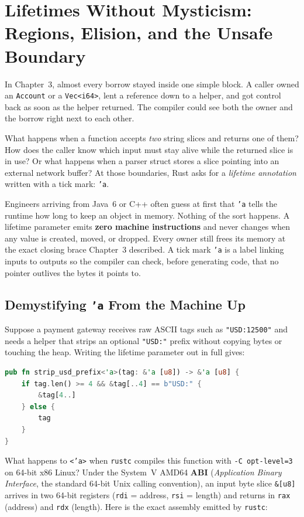 \chapter{Lifetimes Without Mysticism: Regions, Elision, and the Unsafe Boundary}

In Chapter~3, almost every borrow stayed inside one simple block. A caller owned an \texttt{Account} or a \texttt{Vec<i64>}, lent a reference down to a helper, and got control back as soon as the helper returned. The compiler could see both the owner and the borrow right next to each other.

What happens when a function accepts \emph{two} string slices and returns one of them? How does the caller know which input must stay alive while the returned slice is in use? Or what happens when a parser struct stores a slice pointing into an external network buffer? At those boundaries, Rust asks for a \emph{lifetime annotation} written with a tick mark: \texttt{'a}.

Engineers arriving from Java~6 or C++ often guess at first that \texttt{'a} tells the runtime how long to keep an object in memory. Nothing of the sort happens. A lifetime parameter emits \textbf{zero machine instructions} and never changes when any value is created, moved, or dropped. Every owner still frees its memory at the exact closing brace Chapter~3 described. A tick mark \texttt{'a} is a label linking inputs to outputs so the compiler can check, before generating code, that no pointer outlives the bytes it points to.

\chapterline

\section{Demystifying \texttt{'a} From the Machine Up}
\label{ch04:machine-regions}

Suppose a payment gateway receives raw ASCII tags such as \texttt{"USD:12500"} and needs a helper that strips an optional \texttt{"USD:"} prefix without copying bytes or touching the heap. Writing the lifetime parameter out in full gives:

\begin{lstlisting}[language=Rust]
pub fn strip_usd_prefix<'a>(tag: &'a [u8]) -> &'a [u8] {
    if tag.len() >= 4 && &tag[..4] == b"USD:" {
        &tag[4..]
    } else {
        tag
    }
}
\end{lstlisting}

What happens to \texttt{<'a>} when \texttt{rustc} compiles this function with \texttt{-C opt-level=3} on 64-bit x86 Linux? Under the System~V AMD64 \textbf{ABI} (\emph{Application Binary Interface}, the standard 64-bit Unix calling convention), an input byte slice \texttt{\&[u8]} arrives in two 64-bit registers (\texttt{rdi} = address, \texttt{rsi} = length) and returns in \texttt{rax} (address) and \texttt{rdx} (length). Here is the exact assembly emitted by \texttt{rustc}:

